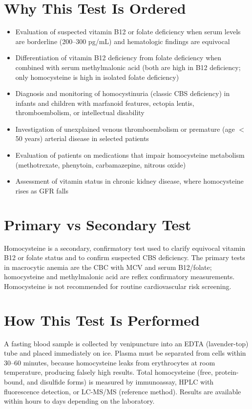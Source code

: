 \section*{Why This Test Is Ordered}
\begin{itemize}
  \item Evaluation of suspected vitamin B12 or folate deficiency when serum levels are borderline (200--300 pg/mL) and hematologic findings are equivocal
  \item Differentiation of vitamin B12 deficiency from folate deficiency when combined with serum methylmalonic acid (both are high in B12 deficiency; only homocysteine is high in isolated folate deficiency) \cite{stabler1990clinical}
  \item Diagnosis and monitoring of homocystinuria (classic CBS deficiency) in infants and children with marfanoid features, ectopia lentis, thromboembolism, or intellectual disability
  \item Investigation of unexplained venous thromboembolism or premature (age $<$50 years) arterial disease in selected patients
  \item Evaluation of patients on medications that impair homocysteine metabolism (methotrexate, phenytoin, carbamazepine, nitrous oxide)
  \item Assessment of vitamin status in chronic kidney disease, where homocysteine rises as GFR falls
\end{itemize}
\section*{Primary vs Secondary Test}
Homocysteine is a secondary, confirmatory test used to clarify equivocal vitamin B12 or folate status and to confirm suspected CBS deficiency. The primary tests in macrocytic anemia are the CBC with MCV and serum B12/folate; homocysteine and methylmalonic acid are reflex confirmatory measurements. Homocysteine is not recommended for routine cardiovascular risk screening.
\section*{How This Test Is Performed}
A fasting blood sample is collected by venipuncture into an EDTA (lavender-top) tube and placed immediately on ice. Plasma must be separated from cells within 30--60 minutes, because homocysteine leaks from erythrocytes at room temperature, producing falsely high results. Total homocysteine (free, protein-bound, and disulfide forms) is measured by immunoassay, HPLC with fluorescence detection, or LC-MS/MS (reference method). Results are available within hours to days depending on the laboratory.
